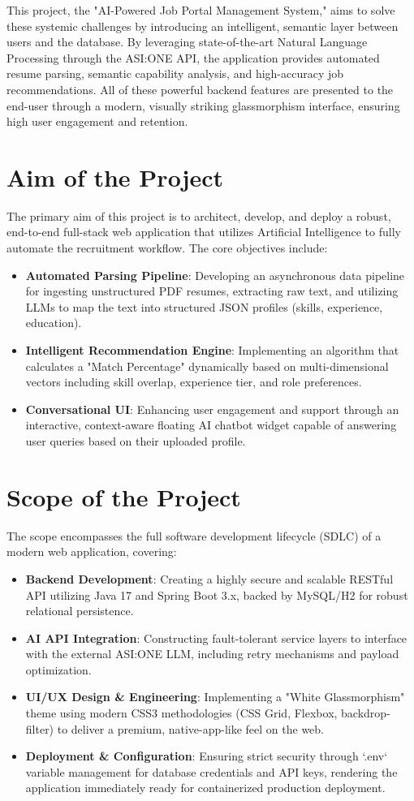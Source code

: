 \documentclass[12pt]{report}
\begin{document}
This project, the "AI-Powered Job Portal Management System," aims to solve these systemic challenges by introducing an intelligent, semantic layer between users and the database. By leveraging state-of-the-art Natural Language Processing through the ASI:ONE API, the application provides automated resume parsing, semantic capability analysis, and high-accuracy job recommendations. All of these powerful backend features are presented to the end-user through a modern, visually striking glassmorphism interface, ensuring high user engagement and retention.

\section{Aim of the Project} 
The primary aim of this project is to architect, develop, and deploy a robust, end-to-end full-stack web application that utilizes Artificial Intelligence to fully automate the recruitment workflow. The core objectives include:
\begin{itemize}
    \item \textbf{Automated Parsing Pipeline}: Developing an asynchronous data pipeline for ingesting unstructured PDF resumes, extracting raw text, and utilizing LLMs to map the text into structured JSON profiles (skills, experience, education).
    \item \textbf{Intelligent Recommendation Engine}: Implementing an algorithm that calculates a "Match Percentage" dynamically based on multi-dimensional vectors including skill overlap, experience tier, and role preferences.
    \item \textbf{Conversational UI}: Enhancing user engagement and support through an interactive, context-aware floating AI chatbot widget capable of answering user queries based on their uploaded profile.
\end{itemize}

\section{Scope of the Project} 
The scope encompasses the full software development lifecycle (SDLC) of a modern web application, covering:
\begin{itemize}
    \item \textbf{Backend Development}: Creating a highly secure and scalable RESTful API utilizing Java 17 and Spring Boot 3.x, backed by MySQL/H2 for robust relational persistence.
    \item \textbf{AI API Integration}: Constructing fault-tolerant service layers to interface with the external ASI:ONE LLM, including retry mechanisms and payload optimization.
    \item \textbf{UI/UX Design \& Engineering}: Implementing a "White Glassmorphism" theme using modern CSS3 methodologies (CSS Grid, Flexbox, backdrop-filter) to deliver a premium, native-app-like feel on the web.
    \item \textbf{Deployment \& Configuration}: Ensuring strict security through `.env` variable management for database credentials and API keys, rendering the application immediately ready for containerized production deployment.
\end{itemize}
\end{document}
